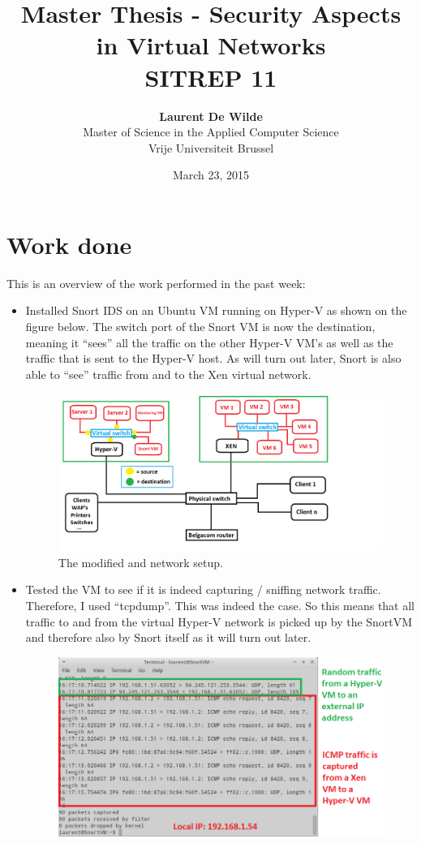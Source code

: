 \documentclass[11pt, a4paper]{article}
\title{Master Thesis -  Security Aspects in Virtual Networks\\ \textbf{SITREP 11}}
\author{\textbf{Laurent De Wilde} \\ Master of Science in the Applied Computer Science \\ Vrije Universiteit Brussel}
\date{March 23, 2015}
\begin{document}
\maketitle

\section*{Work done}

This is an overview of the work performed in the past week:
\begin{itemize}
\item Installed Snort IDS on an Ubuntu VM running on Hyper-V as shown on the figure below. The switch port of the Snort VM is now the destination, meaning it ``sees'' all the traffic on the other Hyper-V VM's as well as the traffic that is sent to the Hyper-V host. As will turn out later, Snort is also able to ``see'' traffic from and to the Xen virtual network.
\begin{figure}[h]
    \centering
    \includegraphics[width=1\textwidth]{Network.png}
   \caption{The modified and network setup.}
\end{figure}
\item Tested the VM to see if it is indeed capturing / sniffing network traffic. Therefore, I used ``tcpdump''. This was indeed the case. So this means that all traffic to and from the virtual Hyper-V network is picked up by the SnortVM and therefore also by Snort itself as it will turn out later.
\begin{figure}[h]
    \centering
    \includegraphics[width=1\textwidth]{Snort_1.png}

\end{figure}
\end{itemize}
\end{document}
